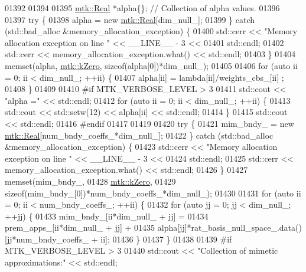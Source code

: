 \begin{DoxyCode}
{{01392 
01394 
01395   \hyperlink{group__c01-roots_gac080bbbf5cbb5502c9f00405f894857d}{mtk::Real} *alpha\{\}; \textcolor{comment}{// Collection of alpha values.}
01396 
01397   \textcolor{keywordflow}{try} \{
01398     alpha = \textcolor{keyword}{new} \hyperlink{group__c01-roots_gac080bbbf5cbb5502c9f00405f894857d}{mtk::Real}[dim\_null\_];
01399   \} \textcolor{keywordflow}{catch} (std::bad\_alloc &memory\_allocation\_exception) \{
01400     std::cerr << \textcolor{stringliteral}{"Memory allocation exception on line "} << \_\_LINE\_\_ - 3 <<
01401       std::endl;
01402     std::cerr << memory\_allocation\_exception.what() << std::endl;
01403   \}
01404   memset(alpha, \hyperlink{group__c01-roots_ga59a451a5fae30d59649bcda274fea271}{mtk::kZero}, \textcolor{keyword}{sizeof}(alpha[0])*dim\_null\_);
01405 
01406   \textcolor{keywordflow}{for} (\textcolor{keyword}{auto} ii = 0; ii < dim\_null\_; ++ii) \{
01407     alpha[ii] = lambda[ii]/weights\_cbs\_[ii] ;
01408   \}
01409 
01410 \textcolor{preprocessor}{  #if MTK\_VERBOSE\_LEVEL > 3}
01411   std::cout << \textcolor{stringliteral}{"alpha ="} << std::endl;
01412   \textcolor{keywordflow}{for} (\textcolor{keyword}{auto} ii = 0; ii < dim\_null\_; ++ii) \{
01413     std::cout << std::setw(12) << alpha[ii] << std::endl;
01414   \}
01415   std::cout << std::endl;
01416 \textcolor{preprocessor}{  #endif}
01417 
01419 
01420   \textcolor{keywordflow}{try} \{
01421     mim\_bndy\_ = \textcolor{keyword}{new} \hyperlink{group__c01-roots_gac080bbbf5cbb5502c9f00405f894857d}{mtk::Real}[num\_bndy\_coeffs\_*dim\_null\_];
01422   \} \textcolor{keywordflow}{catch} (std::bad\_alloc &memory\_allocation\_exception) \{
01423     std::cerr << \textcolor{stringliteral}{"Memory allocation exception on line "} << \_\_LINE\_\_ - 3 <<
01424       std::endl;
01425     std::cerr << memory\_allocation\_exception.what() << std::endl;
01426   \}
01427   memset(mim\_bndy\_,
01428          \hyperlink{group__c01-roots_ga59a451a5fae30d59649bcda274fea271}{mtk::kZero},
01429          \textcolor{keyword}{sizeof}(mim\_bndy\_[0])*num\_bndy\_coeffs\_*dim\_null\_);
01430 
01431   \textcolor{keywordflow}{for} (\textcolor{keyword}{auto} ii = 0; ii < num\_bndy\_coeffs\_; ++ii) \{
01432     \textcolor{keywordflow}{for} (\textcolor{keyword}{auto} jj = 0; jj < dim\_null\_; ++jj) \{
01433       mim\_bndy\_[ii*dim\_null\_ + jj] =
01434         prem\_apps\_[ii*dim\_null\_ + jj] +
01435         alpha[jj]*rat\_basis\_null\_space\_.data()[jj*num\_bndy\_coeffs\_ + ii];
01436     \}
01437   \}
01438 
01439 \textcolor{preprocessor}{  #if MTK\_VERBOSE\_LEVEL > 3}
01440   std::cout << \textcolor{stringliteral}{"Collection of mimetic approximations:"} << std::endl;
}}
\end{DoxyCode}
